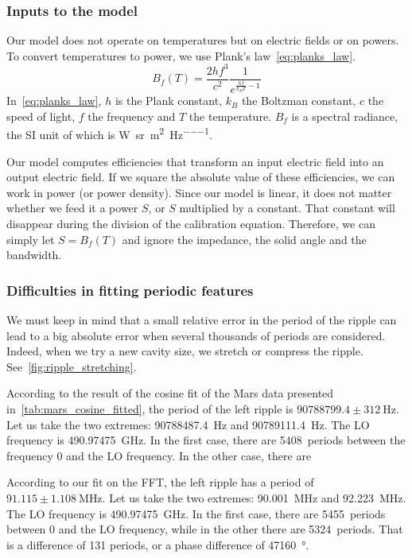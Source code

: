 \subsubsection{Inputs to the model}
Our model does not operate on temperatures but on electric fields or on powers.
To convert temperatures to power, we use Plank's law~\eqref{eq:planks_law}.
\begin{equation}
    B_f(T) = \frac{2 h f^3}{c^2} \frac{1}{e^{\frac{h f}{k_B T} - 1}} \label{eq:planks_law}
\end{equation}
In~\cref{eq:planks_law},
$h$ is the Plank constant, $k_B$ the Boltzman constant, $c$ the speed of light, $f$ the frequency and $T$ the temperature.
$B_f$ is a spectral radiance, the SI unit of which is \si{\watt \per \steradian \per \meter \squared \per \hertz}.

Our model computes efficiencies that transform an input electric field into an output electric field.
If we square the absolute value of these efficiencies, we can work in power (or power density).
Since our model is linear, it does not matter whether we feed it a power $S$, or $S$ multiplied by a constant.
That constant will disappear during the division of the calibration equation.
Therefore, we can simply let $S = B_f(T)$ and ignore the impedance, the solid angle and the bandwidth.




\subsubsection{Difficulties in fitting periodic features}
We must keep in mind that a small relative error in the period of the ripple can lead to a big absolute error when several thousands of periods are considered.
Indeed, when we try a new cavity size, we stretch or compress the ripple.
See~\cref{fig:ripple_stretching}.

According to the result of the cosine fit of the Mars data presented in~\cref{tab:mars_cosine_fitted},
the period of the left ripple is $90788799.4 \pm \SI{312}{\hertz}$.
Let us take the two extremes: \SI{90788487.4}{\hertz} and \SI{90789111.4}{\hertz}.
The LO frequency is \SI{490.97475}{\giga\hertz}.
In the first case, there are \num{5408}~periods between the frequency 0 and the LO frequency.
In the other case, there are 

According to our fit on the FFT, the left ripple has a period of
$91.115 \pm \SI{1.108}{\mega\hertz}$.
Let us take the two extremes: \SI{90.001}{\mega\hertz} and \SI{92.223}{\mega\hertz}.
The LO frequency is \SI{490.97475}{\giga\hertz}.
In the first case, there are \num{5455}~periods between 0 and the LO frequency, while in the other there are \num{5324}~periods.
That is a difference of 131 periods, or a phase difference of \SI{47160}{\degree}.

